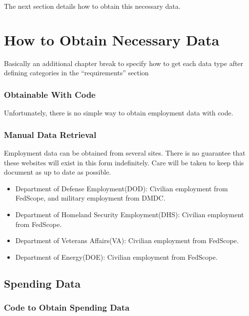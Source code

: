 \documentclass[
]{book}
\begin{document}
The next section details how to obtain this necessary data.

\hypertarget{how-to-obtain-necessary-data}{%
\chapter{How to Obtain Necessary Data}\label{how-to-obtain-necessary-data}}

Basically an additional chapter break to specify how to get each data type after defining categories in the ``requirements'' section

\hypertarget{obtainable-with-code}{%
\subsection{Obtainable With Code}\label{obtainable-with-code}}

Unfortunately, there is no simple way to obtain employment data with code.

\hypertarget{manual-data-retrieval}{%
\subsection{Manual Data Retrieval}\label{manual-data-retrieval}}

Employment data can be obtained from several sites. There is no guarantee that these websites will exist in this form indefinitely. Care will be taken to keep this document as up to date as possible.

\begin{itemize}
\item
  Department of Defense Employment(DOD): Civilian employment from FedScope, and military employment from DMDC.
\item
  Department of Homeland Security Employment(DHS): Civilian employment from FedScope.
\item
  Department of Veterans Affairs(VA): Civilian employment from FedScope.
\item
  Department of Energy(DOE): Civilian employment from FedScope.
\end{itemize}

\hypertarget{spending-data}{%
\section{Spending Data}\label{spending-data}}

\hypertarget{code-to-obtain-spending-data}{%
\subsection{Code to Obtain Spending Data}\label{code-to-obtain-spending-data}}
\end{document}
